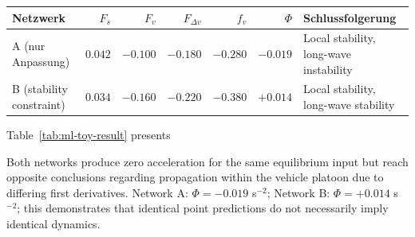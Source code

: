 \documentclass[11pt,a4paper,openany]{book}
\numberwithin{equation}{chapter}
\numberwithin{figure}{chapter}
\numberwithin{table}{chapter}
\newcommand{\tabletext}[2]{%
  \par\smallskip\noindent
  Table~\ref{#1} presents #2
\par\smallskip
}
\begin{document}
\begin{center}
\small
{}
\label{tab:ml-toy-result}
\begin{tabular}{p{2.0cm}rrrrrp{2.5cm}}
\toprule







Netzwerk




& $F_s$ & $F_v$ & $F_{\Delta v}$ & $f_v$ & $\Phi$ &




 Schlussfolgerung



\\
\midrule







A (nur Anpassung)




& $0.042$ & $-0.100$ & $-0.180$ & $-0.280$ & $-0.019$ &






Local stability, long-wave instability





\\









B (stability constraint)






& $0.034$ & $-0.160$ & $-0.220$ & $-0.380$ & $+0.014$ &






Local stability, long-wave stability

\\
\bottomrule
\end{tabular}
\end{center}
\tabletext{tab:ml-toy-result}{

Both networks produce zero acceleration for the same equilibrium input but reach opposite conclusions regarding propagation within the vehicle platoon due to differing first derivatives. Network A: $\Phi=-0.019$ s$^{-2}$; Network B: $\Phi=+0.014$ s$^{-2}$; this demonstrates that identical point predictions do not necessarily imply identical dynamics. }
\end{document}
